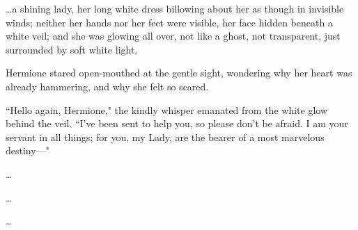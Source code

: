 {\ldots}a shining lady, her long white dress billowing about her as though in invisible winds; neither her hands nor her feet were visible, her face hidden beneath a white veil; and she was glowing all over, not like a ghost, not transparent, just surrounded by soft white light.

Hermione stared open-mouthed at the gentle sight, wondering why her heart was already hammering, and why she felt so scared.

``Hello again, Hermione," the kindly whisper emanated from the white glow behind the veil. ``I've been sent to help you, so please don't be afraid. I am your servant in all things; for you, my Lady, are the bearer of a most marvelous destiny---"

\begin{center}
{\ldots}

{\ldots}

{\ldots}
\end{center}

